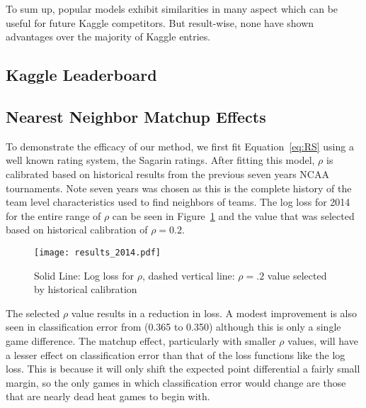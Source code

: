 To sum up, popular models exhibit similarities in many aspect which can be useful for future Kaggle competitors. But result-wise, none have shown advantages over the majority of Kaggle entries. 

\subsection{Kaggle Leaderboard}
\subsection{Nearest Neighbor Matchup Effects}
To demonstrate the efficacy of our method, we first fit Equation~\ref{eq:RS} using a well known rating system, the Sagarin ratings. After fitting this model, $\rho$ is calibrated based on historical results from the previous seven years NCAA tournaments. Note seven years was chosen as this is the complete history of the team level characteristics used to find neighbors of teams. The log loss for 2014 for the entire range of $\rho$ can be seen in Figure~\ref{fig:result} and the value that was selected based on historical calibration of $\rho =0.2$.
\begin{figure}[h!]
\centering
\texttt{[image: results\_2014.pdf]}
\caption{Solid Line: Log loss for $\rho$, dashed vertical line: $\rho=.2$ value selected by historical calibration}
\label{fig:result}
\end{figure} 
The selected $\rho$ value results in a reduction in loss. A modest improvement is also seen in classification error from (0.365 to 0.350) although this is only a single game difference. The matchup effect, particularly with smaller $\rho$ values, will have a lesser effect on classification error than that of the loss functions like the log loss. This is because it will only shift the expected point differential a fairly small margin, so the only games in which classification error would change are those that are nearly dead heat games to begin with.

